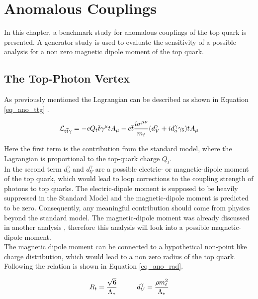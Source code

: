 \chapter{Anomalous Couplings}

In this chapter, a benchmark study for anomalous couplings of the top quark is presented. A generator study is used to evaluate the sensitivity of a possible \ttgamma analysis for a non zero magnetic dipole moment of the top quark.
\section{The Top-Photon Vertex}

As previously mentioned  the \ttgamma Lagrangian can be described as shown in  Equation \ref{eq_ano_ttg} \cite{AguilarSaavedra:2008zc}.

\begin{equation}
  \mathcal{L}_{\mathrm{t}\overline{\mathrm{t}} \gamma} = -e Q_t \overline{t} \gamma^{\mu} t A_{\mu} - e \overline{t} \frac{i \sigma^{\mu \nu}}{m_t} (d_V^{\gamma} + i d_a^{\gamma} \gamma_5) t A_{\mu}
  \label{eq_ano_ttg}
  \end{equation}

Here the first term is the contribution from the standard model, where the Lagrangian is proportional to the top-quark charge $Q_t$.\\
In the second term $d_a^{\gamma}$ and $d_V^{\gamma}$ are a possible electric- or  magnetic-dipole moment of the top quark, which would lead to loop corrections to the coupling strength of photons to top quarks. The electric-dipole moment is supposed to be heavily suppressed in the Standard Model \cite{Jersak:1981sp} and the magnetic-dipole moment is predicted to be zero. Consequently, any meaningful contribution should come from physics beyond the standard model. The magnetic-dipole moment was already discussed in another analysis , therefore this analysis will look into a possible magnetic-dipole moment.\\
The  magnetic dipole moment can be connected to a hypothetical non-point like charge distribution, which would lead to a non zero radius of the top quark. Following \cite{Englert:2012by} \cite{Kopp:1994qv} the relation is shown in Equation \ref{eq_ano_rad}.

\begin{equation}
R_t = \frac{\sqrt{6}}{\Lambda_{\ast}} \hspace{1.cm} d_V^{\gamma} = \frac{\rho m_t^2}{\Lambda_{\ast}}
\label{eq_ano_rad}
\end{equation}

